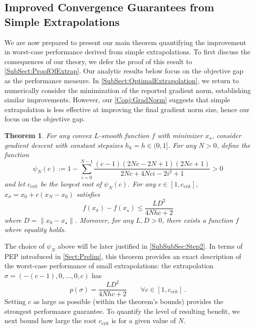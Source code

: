 \documentclass[11pt]{article}
\numberwithin{equation}{section}
\newtheorem{theorem}{Theorem}[section]
\theoremstyle{definition}
\theoremstyle{definition}
\theoremstyle{definition}
\newcommand{\1}{\mathbf{1}}
\newcommand{\xStar}{x_\star}
\newcommand{\xSpecial}{x_\sigma}
\newcommand{\cCrit}{c_\mathrm{crit}}
\newcommand{\detDenom}[1]{2N{#1}+4N{#1}i-2i^2+1}
\newcommand{\psiNum}[1]{({#1}-1)(2N{#1}-2N+1)(2N{#1}+1)}
\begin{document}
\subsection{Improved Convergence Guarantees from Simple Extrapolations}
We are now prepared to present our main theorem quantifying the improvement in worst-case performance derived from simple extrapolations. To first discuss the consequences of our theory, we defer the proof of this result to \cref{SubSect:ProofOfExtrap}. Our analytic results below focus on the objective gap as the performance measure. In \cref{SubSect:OptimalExtrapolation}, we return to numerically consider the minimization of the reported gradient norm, establishing similar improvements. However, our \cref{Conj:GradNorm} suggests that simple extrapolation is less effective at improving the final gradient norm size, hence our focus on the objective gap.

\begin{theorem}\label{Thm:MainExtrapThm}
    For any convex $L$-smooth function $f$ with minimizer $\xStar$, consider gradient descent with constant stepsizes $h_k = h\in(0,1]$. For any $N > 0$, define the function
    \begin{equation}\label{Eqn:psi}
        \psi_N(c) := 1 - \sum_{i=0}^{N-1} \frac{\psiNum{c}}{\detDenom{c}} > 0
    \end{equation}
    and let $\cCrit$ be the largest root of $\psi_N(c)$. For any $c \in [1,\cCrit]$, $\xSpecial = x_0 + c(x_N-x_0)$ satisfies
    \begin{equation}\label{Eqn:NewBound}
        f(\xSpecial) - f(\xStar) \leq \frac{LD^2}{4Nhc+2}
    \end{equation}
    where $D=\|x_0-\xStar\|$.
    Moreover, for any $L,D > 0$, there exists a function $f$ where equality holds.
\end{theorem}

The choice of $\psi_N$ above will be later justified in \cref{SubSubSec:Step2}. In terms of PEP introduced in \cref{Sect:Prelim}, this theorem provides an exact description of the worst-case performance of small extrapolations: the extrapolation $\sigma = (-(c-1),0,\dots, 0, c)$ has
$$ p(\sigma) = \frac{LD^2}{4Nhc+2} \qquad \forall c\in [1,\cCrit]\ . $$
Setting $c$ as large as possible (within the theorem's bounds) provides the strongest performance guarantee. To quantify the level of resulting benefit, we next bound how large the root $\cCrit$ is for a given value of $N$.
\end{document}
